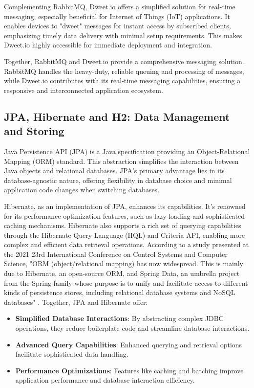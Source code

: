 Complementing RabbitMQ, Dweet.io offers a simplified solution for real-time messaging, especially beneficial for Internet of Things (IoT) applications. It enables devices to "dweet" messages for instant access by subscribed clients, emphasizing timely data delivery with minimal setup requirements. This makes Dweet.io highly accessible for immediate deployment and integration.

Together, RabbitMQ and Dweet.io provide a comprehensive messaging solution. RabbitMQ handles the heavy-duty, reliable queuing and processing of messages, while Dweet.io contributes with its real-time messaging capabilities, ensuring a responsive and interconnected application ecosystem.



\subsection{JPA, Hibernate and H2: Data Management and Storing}

Java Persistence API (JPA) is a Java specification providing an Object-Relational Mapping (ORM) standard. 
This abstraction simplifies the interaction between Java objects and relational databases. 
JPA's primary advantage lies in its database-agnostic nature, offering flexibility in database choice and minimal application code changes when switching databases.

Hibernate, as an implementation of JPA, enhances its capabilities. 
It's renowned for its performance optimization features, such as lazy loading and sophisticated caching mechanisms. 
Hibernate also supports a rich set of querying capabilities through the Hibernate Query Language (HQL) and Criteria API, enabling more complex and efficient data retrieval operations. 
According to a study presented at the 2021 23rd International Conference on Control Systems and Computer Science, "ORM (object/relational mapping) has now widespread. This is mainly due to Hibernate, an open-source ORM, and Spring Data, an umbrella project from the Spring family whose purpose is to unify and facilitate access to different kinds of persistence stores, including relational database systems and NoSQL databases" \cite{orm2021cscs}.
Together, JPA and Hibernate offer:

\begin{itemize}
  \item \textbf{Simplified Database Interactions}: By abstracting complex JDBC operations, they reduce boilerplate code and streamline database interactions.
  \item \textbf{Advanced Query Capabilities}: Enhanced querying and retrieval options facilitate sophisticated data handling.
  \item \textbf{Performance Optimizations}: Features like caching and batching improve application performance and database interaction efficiency.
\end{itemize}

